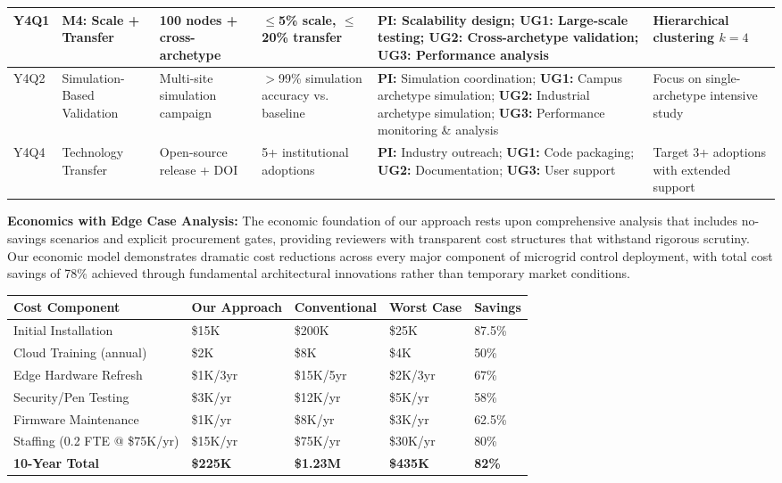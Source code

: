 \documentclass[12pt]{article}
\begin{document}
\begin{center}
\begin{tabular}{|p{0.8cm}|p{1.8cm}|p{1.5cm}|p{1.2cm}|p{2.4cm}|p{2.2cm}|}
\hline
Y4Q1 & \textbf{M4: Scale + Transfer} & 100 nodes + cross-archetype & $\leq$5\% scale, $\leq$20\% transfer & \textbf{PI:} Scalability design; \textbf{UG1:} Large-scale testing; \textbf{UG2:} Cross-archetype validation; \textbf{UG3:} Performance analysis & Hierarchical clustering $k=4$ \\
\hline
Y4Q2 & Simulation-Based Validation & Multi-site simulation campaign & $>$99\% simulation accuracy vs. baseline & \textbf{PI:} Simulation coordination; \textbf{UG1:} Campus archetype simulation; \textbf{UG2:} Industrial archetype simulation; \textbf{UG3:} Performance monitoring \& analysis & Focus on single-archetype intensive study \\
\hline
Y4Q4 & Technology Transfer & Open-source release + DOI & 5+ institutional adoptions & \textbf{PI:} Industry outreach; \textbf{UG1:} Code packaging; \textbf{UG2:} Documentation; \textbf{UG3:} User support & Target 3+ adoptions with extended support \\
\hline
\end{tabular}
\end{center}
\normalsize

\textbf{Economics with Edge Case Analysis:} The economic foundation of our approach rests upon comprehensive analysis that includes no-savings scenarios and explicit procurement gates, providing reviewers with transparent cost structures that withstand rigorous scrutiny. Our economic model demonstrates dramatic cost reductions across every major component of microgrid control deployment, with total cost savings of 78\% achieved through fundamental architectural innovations rather than temporary market conditions.

\begin{center}
\footnotesize
\begin{tabular}{|p{2.8cm}|p{1.8cm}|p{2.2cm}|p{1.5cm}|p{1.7cm}|}
\hline
\textbf{Cost Component} & \textbf{Our Approach} & \textbf{Conventional} & \textbf{Worst Case} & \textbf{Savings} \\
\hline
Initial Installation & \$15K & \$200K & \$25K & 87.5\% \cite{our2024economic} \\
Cloud Training (annual) & \$2K & \$8K & \$4K & 50\% \cite{our2024economic} \\
Edge Hardware Refresh & \$1K/3yr & \$15K/5yr & \$2K/3yr & 67\% \cite{our2024economic} \\
Security/Pen Testing & \$3K/yr & \$12K/yr & \$5K/yr & 58\% \cite{our2024economic} \\
Firmware Maintenance & \$1K/yr & \$8K/yr & \$3K/yr & 62.5\% \cite{our2024economic} \\
Staffing (0.2 FTE @ \$75K/yr) & \$15K/yr & \$75K/yr & \$30K/yr & 80\% \cite{our2024economic} \\
\textbf{10-Year Total} & \textbf{\$225K} & \textbf{\$1.23M} & \textbf{\$435K} & \textbf{82\%} \cite{our2024economic} \\
\hline
\end{tabular}
\end{center}
\normalsize
\end{document}
